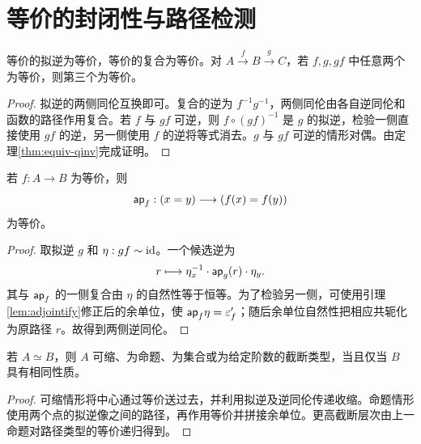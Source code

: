 \section{等价的封闭性与路径检测}
\begin{proposition}[逆、复合及二取三]
等价的拟逆为等价，等价的复合为等价。对 $A\xrightarrow fB\xrightarrow gC$，若 $f,g,gf$ 中任意两个为等价，则第三个为等价。
\end{proposition}
\begin{proof}
拟逆的两侧同伦互换即可。复合的逆为 $f^{-1}g^{-1}$，两侧同伦由各自逆同伦和函数的路径作用复合。若 $f$ 与 $gf$ 可逆，则 $f\circ(gf)^{-1}$ 是 $g$ 的拟逆，检验一侧直接使用 $gf$ 的逆，另一侧使用 $f$ 的逆将等式消去。$g$ 与 $gf$ 可逆的情形对偶。由定理\ref{thm:equiv-qinv}完成证明。
\end{proof}
\begin{proposition}[等价作用于路径类型]
若 $f:A\to B$ 为等价，则
\[
\mathsf{ap}_f:(x=y)\longrightarrow(f(x)=f(y))
\]
为等价。
\end{proposition}
\begin{proof}
取拟逆 $g$ 和 $\eta:gf\sim\operatorname{id}$。一个候选逆为
\[
r\longmapsto\eta_x^{-1}\cdot\mathsf{ap}_g(r)\cdot\eta_y.
\]
其与 $\mathsf{ap}_f$ 的一侧复合由 $\eta$ 的自然性等于恒等。为了检验另一侧，可使用引理\ref{lem:adjointify}修正后的余单位，使 $\mathsf{ap}_f\eta=\varepsilon'_f$；随后余单位自然性把相应共轭化为原路径 $r$。故得到两侧逆同伦。
\end{proof}
\begin{proposition}[截断性在等价下不变]
若 $A\simeq B$，则 $A$ 可缩、为命题、为集合或为给定阶数的截断类型，当且仅当 $B$ 具有相同性质。
\end{proposition}
\begin{proof}
可缩情形将中心通过等价送过去，并利用拟逆及逆同伦传递收缩。命题情形使用两个点的拟逆像之间的路径，再作用等价并拼接余单位。更高截断层次由上一命题对路径类型的等价递归得到。
\end{proof}

